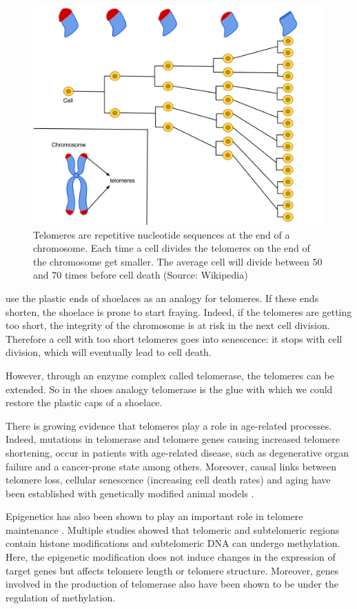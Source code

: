 \documentclass[
  11pt,
]{book}
\begin{document}
\begin{figure}

{\centering \includegraphics[width=0.8\linewidth]{./figs/telomeres} 

}

\caption{Telomeres are repetitive nucleotide sequences at the end of a chromosome. Each time a cell divides the telomeres on the end of the chromosome get smaller. The average cell will divide between 50 and 70 times before cell death (Source: Wikipedia)}\label{fig:telomeres}
\end{figure}

\citet{BlackburnEpel2017} use the plastic ends of shoelaces as an analogy for telomeres. If these ends shorten, the shoelace is prone to start fraying. Indeed, if the telomeres are getting too short, the integrity of the chromosome is at risk in the next cell division. Therefore a cell with too short telomeres goes into senescence: it stops with cell division, which will eventually lead to cell death.

However, through an enzyme complex called telomerase, the telomeres can be extended. So in the shoes analogy telomerase is the glue with which we could restore the plastic caps of a shoelace.

There is growing evidence that telomeres play a role in age-related processes. Indeed, mutations in telomerase and telomere genes causing increased telomere shortening, occur in patients with age-related disease, such as degenerative organ failure and a cancer-prone state among others. Moreover, causal links between telomere loss, cellular senescence (increasing cell death rates) and aging have been established with genetically modified animal models \citep{Adwan2018}.

Epigenetics has also been shown to play an important role in telomere maintenance \citep{Adwan2018}.
Multiple studies showed that telomeric and subtelomeric regions contain histone modifications and subtelomeric DNA can undergo methylation.
Here, the epigenetic modification does not induce changes in the expression of target genes but affects telomere length or telomere structure.
Moreover, genes involved in the production of telomerase also have been shown to be under the regulation of methylation.
\end{document}
